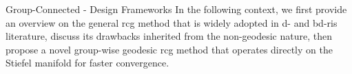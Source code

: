 \documentclass[journal]{IEEEtran}
\begin{document}
\begin{section}{Group-Connected - Design Frameworks}
	In the following context, we first provide an overview on the general \gls{rcg} method that is widely adopted in \gls{d}- and \gls{bd}-\gls{ris} literature, discuss its drawbacks inherited from the non-geodesic nature, then propose a novel group-wise geodesic \gls{rcg} method that operates directly on the Stiefel manifold for faster convergence.


\end{section}
\end{document}
